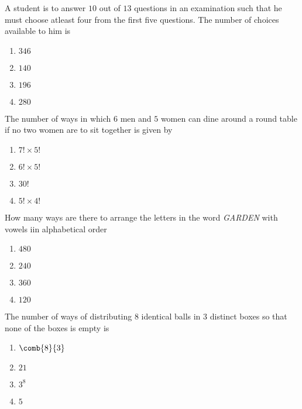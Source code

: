 \iffalse
\title{Chapter 4 Permutations and Combinations}
\author{EE24BTECH11012 - Bhavanisankar G S}
\section{mains}
\fi
	\item A student is to answer $10$ out of $13$ questions in an examination such that he must choose atleast four from the first five questions. The number of choices available to him is  \hfill {}	
       \begin{multicols}{4}		
\begin{enumerate} 
    \item  $346$
    \item  $140 $
    \item  $196$
    \item  $280$
      \end{enumerate}
      \end{multicols}
\item The number of ways in which $6$ men and $5$ women can dine around a round table if no two women are to sit together is given by \hfill {}
	\begin{multicols}{4}	
 \begin{enumerate}
 \item $7!\times5!$
 \item $6!\times 5!$
 \item $30!$
 \item $5!\times4!$
 \end{enumerate}
	\end{multicols}
\item How many ways are there to arrange the letters in the word \emph{GARDEN} with vowels iin alphabetical order \hfill {}
	\begin{multicols}{4}
		\begin{enumerate}
     \item $480$
     \item $240$
     \item $360$
     \item $120$
 \end{enumerate}
	\end{multicols}
\item The number of ways of distributing 8 identical balls in $3$ distinct boxes so that none of the boxes is empty is \hfill {}
	\begin{multicols}{4}
		\begin{enumerate}
			\item $ \comb{8}{3}$
     \item $21$
     \item $3^8$
     \item $5$
 \end{enumerate}
	\end{multicols}
